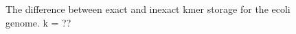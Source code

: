 \documentclass[12pt]{article} \usepackage{simplemargins}
\begin{document}
\begin{figure}
\caption{The difference between exact and inexact kmer storage for the
ecoli genome. k = ??}
\end{figure}
\end{document}
